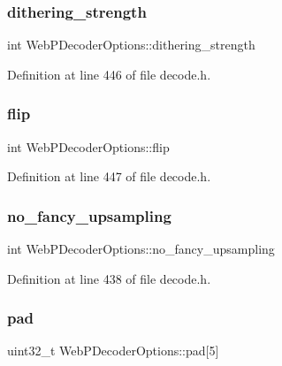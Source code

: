 \subsubsection{\texorpdfstring{dithering\_strength}{dithering\_strength}}
{\footnotesize\ttfamily int Web\+P\+Decoder\+Options\+::dithering\+\_\+strength}



Definition at line 446 of file decode.\+h.

\mbox{\label{struct_web_p_decoder_options_af0aad48dc78f4db143d32f6e2222a498}} 
\subsubsection{\texorpdfstring{flip}{flip}}
{\footnotesize\ttfamily int Web\+P\+Decoder\+Options\+::flip}



Definition at line 447 of file decode.\+h.

\mbox{\label{struct_web_p_decoder_options_a76cd8b191fa024dec964cc83b3a915a9}} 
\subsubsection{\texorpdfstring{no\_fancy\_upsampling}{no\_fancy\_upsampling}}
{\footnotesize\ttfamily int Web\+P\+Decoder\+Options\+::no\+\_\+fancy\+\_\+upsampling}



Definition at line 438 of file decode.\+h.

\mbox{\label{struct_web_p_decoder_options_ad77c24ba77e0d50e286d425101b3d69e}} 
\subsubsection{\texorpdfstring{pad}{pad}}
{\footnotesize\ttfamily uint32\+\_\+t Web\+P\+Decoder\+Options\+::pad\mbox{[}5\mbox{]}}



